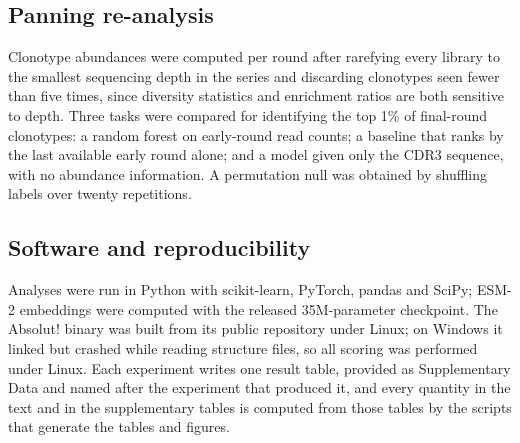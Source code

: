 \documentclass[11pt,a4paper]{article}
\begin{document}
\subsection*{Panning re-analysis}

Clonotype abundances were computed per round after rarefying every library to
the smallest sequencing depth in the series and discarding clonotypes seen
fewer than five times, since diversity statistics and enrichment ratios are
both sensitive to depth. Three tasks were compared for identifying the top 1\%
of final-round clonotypes: a random forest on early-round read counts; a
baseline that ranks by the last available early round alone; and a model given
only the CDR3 sequence, with no abundance information. A permutation null was
obtained by shuffling labels over twenty repetitions.

\subsection*{Software and reproducibility}

Analyses were run in Python with scikit-learn, PyTorch, pandas and SciPy; ESM-2
embeddings were computed with the released 35M-parameter checkpoint. The
Absolut! binary was built from its public repository under Linux; on Windows it
linked but crashed while reading structure files, so all scoring was performed
under Linux. Each experiment writes one result table, provided as Supplementary
Data and named after the experiment that produced it, and every quantity in the
text and in the supplementary tables is computed from those tables by the
scripts that generate the tables and figures.
\end{document}
